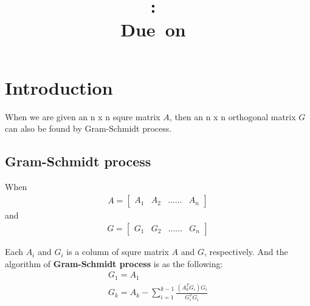 \documentclass{article}
\title{
\vspace{2in}
\textmd{\textbf{\hmwkClass:\ \hmwkTitle}}\\
\normalsize\vspace{0.1in}\small{Due\ on\ \hmwkDueDate}\\
\vspace{3in}
}
\author{\textbf{\hmwkAuthorName}}
\date{} %
\begin{document}
\maketitle



\newpage


\section{Introduction}
When we are given an n x n squre matrix $A$, then an n x n orthogonal matrix $G$ can also be found by Gram-Schmidt process. \newline
\subsection{Gram-Schmidt process}
When \newline
\begin{gather}
    A = \begin{bmatrix}A_1 & A_2 & ...... & A_n \end{bmatrix}
\end{gather}
and \newline
\begin{gather}
    G = \begin{bmatrix}G_1 & G_2 & ...... & G_n\end{bmatrix}
\end{gather}

Each $A_i$ and $G_i$ is a column of squre matrix $A$ and $G$, respectively. And the algorithm of \textbf{Gram-Schmidt process} is as the
following: \newline
\begin{gather}
    G_1 = A_1 \\
    G_k = A_k - \sum_{i=1}^{k-1}{\frac{(A_k^TG_i)G_i}{G_i^TG_i}}
\end{gather}
\end{document}
